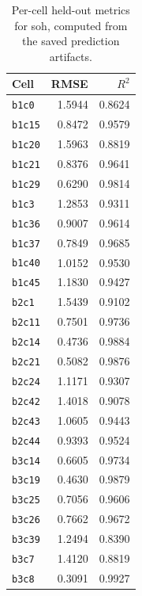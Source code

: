 \begin{table}[p]
    \centering
    \caption{Per-cell held-out metrics for \ac{soh}, computed from the saved prediction artifacts.}
    \label{tab:per_cell_metrics_soh}
    \begin{tabular}{lrr}
    \toprule
    Cell & RMSE & $R^2$ \\
    \midrule
    \texttt{b1c0} & 1.5944 & 0.8624 \\
    \texttt{b1c15} & 0.8472 & 0.9579 \\
    \texttt{b1c20} & 1.5963 & 0.8819 \\
    \texttt{b1c21} & 0.8376 & 0.9641 \\
    \texttt{b1c29} & 0.6290 & 0.9814 \\
    \texttt{b1c3} & 1.2853 & 0.9311 \\
    \texttt{b1c36} & 0.9007 & 0.9614 \\
    \texttt{b1c37} & 0.7849 & 0.9685 \\
    \texttt{b1c40} & 1.0152 & 0.9530 \\
    \texttt{b1c45} & 1.1830 & 0.9427 \\
    \texttt{b2c1} & 1.5439 & 0.9102 \\
    \texttt{b2c11} & 0.7501 & 0.9736 \\
    \texttt{b2c14} & 0.4736 & 0.9884 \\
    \texttt{b2c21} & 0.5082 & 0.9876 \\
    \texttt{b2c24} & 1.1171 & 0.9307 \\
    \texttt{b2c42} & 1.4018 & 0.9078 \\
    \texttt{b2c43} & 1.0605 & 0.9443 \\
    \texttt{b2c44} & 0.9393 & 0.9524 \\
    \texttt{b3c14} & 0.6605 & 0.9734 \\
    \texttt{b3c19} & 0.4630 & 0.9879 \\
    \texttt{b3c25} & 0.7056 & 0.9606 \\
    \texttt{b3c26} & 0.7662 & 0.9672 \\
    \texttt{b3c39} & 1.2494 & 0.8390 \\
    \texttt{b3c7} & 1.4120 & 0.8819 \\
    \texttt{b3c8} & 0.3091 & 0.9927 \\
    \bottomrule
    \end{tabular}
\end{table}

